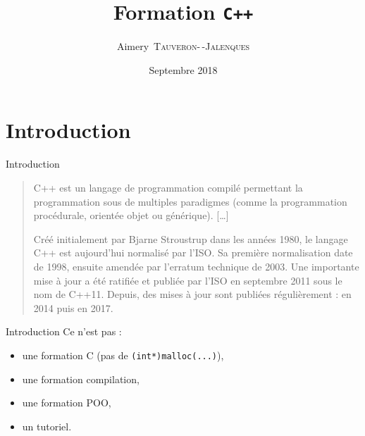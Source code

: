 \documentclass{beamer}
\title{Formation \texttt{C++}}
\date{Septembre 2018}
\author[A.~\textsc{Tauveron}]{Aimery~\textsc{Tauveron-\,-Jalenques}}
\institute{\href{https://viarezo.fr/}{ViaRézo}}
\begin{document}
\lstset{breaklines=true, showstringspaces=false}
\lstset{language=[11]C++}

\frame{\titlepage}


\section*{Introduction}
\label{sec:introduction}
\begin{frame}{Introduction}
  \begin{quotation}
    C++ est un langage de programmation compilé permettant la programmation sous de multiples paradigmes (comme la programmation procédurale, orientée objet ou générique). [\dots{}]

    Créé initialement par Bjarne Stroustrup dans les années 1980, le langage C++ est aujourd'hui normalisé par l'ISO. Sa première normalisation date de 1998, ensuite amendée par l'erratum technique de 2003. Une importante mise à jour a été ratifiée et publiée par l'ISO en septembre 2011 sous le nom de C++11. Depuis, des mises à jour sont publiées régulièrement : en 2014 puis en 2017.
  \end{quotation}

\end{frame}

\begin{frame}{Introduction}
  Ce n'est pas :
  \begin{itemize}
  \item une formation C (pas de \texttt{(int*)malloc(...)}),
  \item une formation compilation,
  \item une formation POO,
  \item un tutoriel.
  \end{itemize}
\end{frame}


\frame{\tableofcontents}
\end{document}
